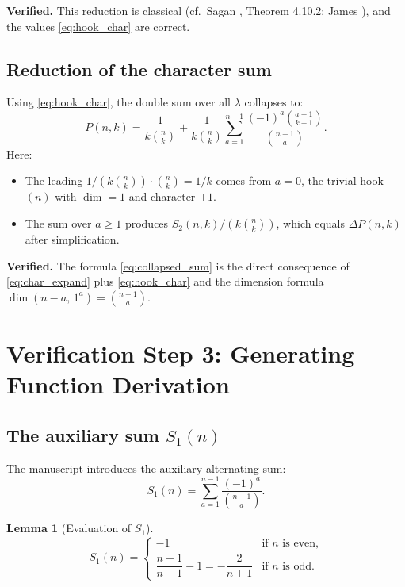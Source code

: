 \documentclass[12pt, a4paper]{amsart}
\theoremstyle{plain}
\newtheorem{lemma}[theorem]{Lemma}
\theoremstyle{definition}
\theoremstyle{remark}
\newcommand{\hook}[2]{(#1\!-\!#2,\,1^{#2})}
\newcommand{\deltap}{\Delta P(n,k)}
\begin{document}
\textcolor{verified}{\textbf{Verified.}}
This reduction is classical (cf.\ Sagan \cite{sagan}, Theorem 4.10.2; James
\cite{james}), and the values \eqref{eq:hook_char} are correct.

\subsection{Reduction of the character sum}

Using \eqref{eq:hook_char}, the double sum over all $\lambda$ collapses to:
\begin{equation}\label{eq:collapsed_sum}
  P(n,k)
  = \frac{1}{k\binom{n}{k}}
    + \frac{1}{k\binom{n}{k}}
    \sum_{a=1}^{n-1}
    \frac{(-1)^a \binom{a-1}{k-1}}{\binom{n-1}{a}}.
\end{equation}
Here:
\begin{itemize}
  \item The leading $1/(k\binom{n}{k})\cdot\binom{n}{k} = 1/k$ comes from
        $a=0$, the trivial hook $(n)$ with $\dim = 1$ and character $+1$.
  \item The sum over $a\ge 1$ produces $S_2(n,k)/( k\binom{n}{k})$, which
        equals $\deltap$ after simplification.
\end{itemize}
\textcolor{verified}{\textbf{Verified.}}  The formula \eqref{eq:collapsed_sum}
is the direct consequence of \eqref{eq:char_expand} plus \eqref{eq:hook_char}
and the dimension formula $\dim\hook{n}{a} = \binom{n-1}{a}$.

\section{Verification Step 3: Generating Function Derivation}
\label{sec:step3}

\subsection{The auxiliary sum $S_1(n)$}

The manuscript introduces the auxiliary alternating sum:
\begin{equation}\label{eq:S1}
  S_1(n) = \sum_{a=1}^{n-1} \frac{(-1)^a}{\binom{n-1}{a}}.
\end{equation}

\begin{lemma}[Evaluation of $S_1$]\label{lem:S1}
\[
  S_1(n) = \begin{cases}
    -1 & \text{if } n \text{ is even,}\\[4pt]
    \dfrac{n-1}{n+1} - 1 = -\dfrac{2}{n+1} & \text{if } n \text{ is odd.}
  \end{cases}
\]
\end{lemma}
\end{document}
